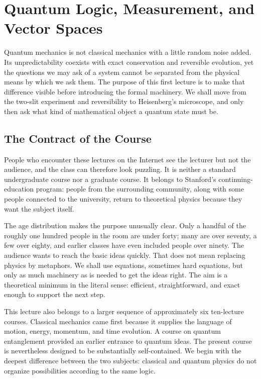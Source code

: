 \chapter{Quantum Logic, Measurement, and Vector Spaces}

Quantum mechanics is not classical mechanics with a little random noise
added. Its unpredictability coexists with exact conservation and reversible
evolution, yet the questions we may ask of a system cannot be separated from
the physical means by which we ask them. The purpose of this first lecture is
to make that difference visible before introducing the formal machinery. We
shall move from the two-slit experiment and reversibility to Heisenberg's
microscope, and only then ask what kind of mathematical object a quantum state
must be.

\section{The Contract of the Course}

People who encounter these lectures on the Internet see the lecturer but not
the audience, and the class can therefore look puzzling. It is neither a
standard undergraduate course nor a graduate course. It belongs to Stanford's
continuing-education program: people from the surrounding community, along
with some people connected to the university, return to theoretical physics
because they want the subject itself.

The age distribution makes the purpose unusually clear. Only a handful of
the roughly one hundred people in the room are under forty; many are over
seventy, a few over eighty, and earlier classes have even included people over
ninety. The audience wants to reach the basic ideas quickly. That does not
mean replacing physics by metaphors. We shall use equations, sometimes hard
equations, but only as much machinery as is needed to get the ideas right.
The aim is a theoretical minimum in the literal sense: efficient,
straightforward, and exact enough to support the next step.

This lecture also belongs to a larger sequence of approximately six
ten-lecture courses. Classical mechanics came first because it supplies the
language of motion, energy, momentum, and time evolution. A course on quantum
entanglement provided an earlier entrance to quantum ideas. The present
course is nevertheless designed to be substantially self-contained. We begin
with the deepest difference between the two subjects: classical and quantum
physics do not organize possibilities according to the same logic.

